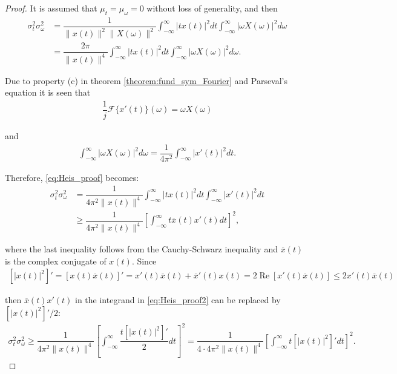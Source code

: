 \begin{proof}
It is assumed that $\mu_t = \mu_\omega = 0$ without loss of generality, and then
\begin{align} \label{eq:Heis_proof}
\sigma_t^2 \sigma_\omega^2 &= \dfrac{1}{\|x(t)\|^2 \|X(\omega)\|^2} \int_{-\infty}^\infty |tx(t)|^2 dt \int_{-\infty}^\infty |\omega X(\omega)|^2 d\omega \\
&= \dfrac{2\pi}{\|x(t)\|^4} \int_{-\infty}^\infty |tx(t)|^2 dt \int_{-\infty}^\infty |\omega X(\omega)|^2 d\omega.
\end{align}

Due to property (c) in theorem \ref{theorem:fund_sym_Fourier} and Parseval's equation it is seen that
\begin{align*}
\dfrac{1}{j} \mathcal{F}\{x'(t)\}(\omega) = \omega X(\omega)
\end{align*}

and 
\begin{align*}
\int_{-\infty}^\infty |\omega X(\omega)|^2 d\omega = \dfrac{1}{4\pi^2} \int_{-\infty}^\infty |x'(t)|^2 dt.
\end{align*}

Therefore, \eqref{eq:Heis_proof} becomes:
\begin{align} \label{eq:Heis_proof2}
\sigma_t^2 \sigma_\omega^2 &= \dfrac{1}{4\pi^2 \|x(t)\|^4} \int_{-\infty}^\infty |tx(t)|^2 dt \int_{-\infty}^\infty | x'(t)|^2 dt \nonumber \\
&\geq \dfrac{1}{4\pi^2 \|x(t)\|^4} \left[ \int_{-\infty}^\infty t \overline{x}(t)x'(t) dt \right]^2,
\end{align}

where the last inequality follows from the Cauchy-Schwarz inequality and $\overline{x}(t)$ is the complex conjugate of $x(t)$. Since
\begin{align*}
\left[ |x(t)|^2 \right]' = \left[ x(t) \overline{x}(t) \right]' = x'(t) \overline{x}(t) + \overline{x}'(t) x(t) = 2 \operatorname{Re} \left[ x'(t) \overline{x}(t) \right] \leq 2 x'(t) \overline{x}(t)
\end{align*}

then $\overline{x}(t) x'(t)$ in the integrand in \eqref{eq:Heis_proof2} can be replaced by $\left[ |x(t)|^2 \right]'/2$:
\begin{align} \label{eq:Heis_proof3}
\sigma_t^2 \sigma_\omega^2 \geq \dfrac{1}{4\pi^2 \|x(t)\|^4} \left[ \int_{-\infty}^\infty \dfrac{t \left[ |x(t)|^2 \right]'}{2} dt \right]^2 = \dfrac{1}{4 \cdot 4\pi^2 \|x(t)\|^4} \left[ \int_{-\infty}^\infty t \left[ |x(t)|^2 \right]' dt \right]^2.
\end{align}


\end{proof}
